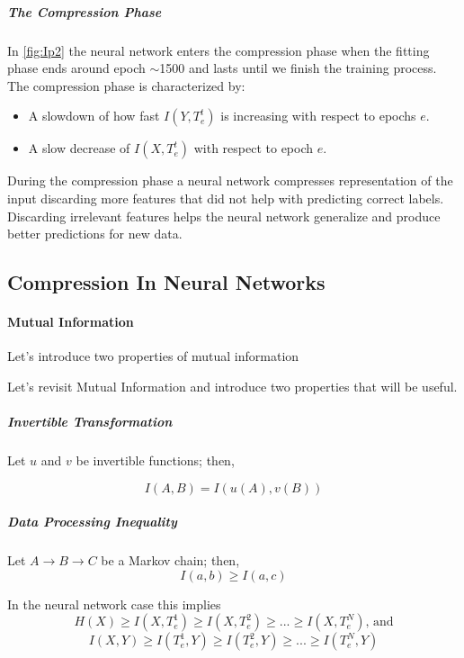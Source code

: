 \subparagraph{The Compression Phase} In \autoref{fig:Ip2} the neural network
enters the compression phase when the fitting phase ends around epoch $\sim$1500
and lasts until we finish the training process. The compression phase is
characterized by:
\begin{itemize}
  \item{
      A slowdown of how fast $I(Y, T_e^t)$ is increasing with respect to epochs
      $e$. 
    }
  \item{
      A slow decrease of $I(X, T_e^t)$ with respect to epoch $e$.
    }
\end{itemize}

During the compression phase a neural network compresses representation of the
input discarding more features that did not help with predicting correct labels.
Discarding irrelevant features helps the neural network generalize and produce
better predictions for new data. 

\subsection{Compression In Neural Networks}

\paragraph{Mutual Information} 
Let's introduce two properties of mutual information 

Let's revisit Mutual Information and introduce two properties that will be
useful.

\subparagraph{Invertible Transformation} 
Let $u$ and $v$ be invertible functions; then,

\begin{equation}
  I(A, B) = I(u(A), v(B))
\end{equation}

\subparagraph{Data Processing Inequality} 
Let $ A \rightarrow B \rightarrow C$ be a Markov chain; then,
\begin{equation}
  I(a,b) \geq I(a,c)
\end{equation}

In the neural network case this implies 
\begin{equation}
  H(X) \geq I(X,T_e^1) \geq I(X, T_e^2) \geq ... \geq I(X,T_e^N) \text{, and}
  \label{eq:dpiIneq1}
\end{equation}
\begin{equation}
  I(X, Y) \geq I(T_e^1, Y) \geq I(T_e^2, Y) \geq ... \geq I(T_e^N, Y)
  \label{eq:dpiIneq2}
\end{equation}

